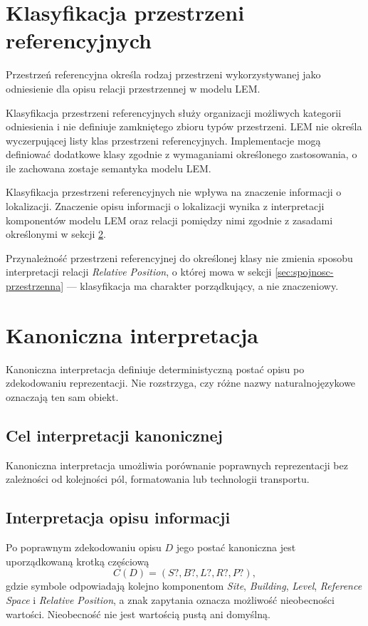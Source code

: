 \section{Klasyfikacja przestrzeni referencyjnych}
\label{sec:klasyfikacja-przestrzeni}
Przestrzeń referencyjna określa rodzaj przestrzeni wykorzystywanej jako odniesienie dla opisu relacji przestrzennej w modelu LEM.

Klasyfikacja przestrzeni referencyjnych służy organizacji możliwych kategorii odniesienia i nie definiuje zamkniętego zbioru typów przestrzeni. LEM nie określa wyczerpującej listy klas przestrzeni referencyjnych. Implementacje mogą definiować dodatkowe klasy zgodnie z wymaganiami określonego zastosowania, o ile zachowana zostaje semantyka modelu LEM.

Klasyfikacja przestrzeni referencyjnych nie wpływa na znaczenie informacji o lokalizacji. Znaczenie opisu informacji o lokalizacji wynika z interpretacji komponentów modelu LEM oraz relacji pomiędzy nimi zgodnie z zasadami określonymi w sekcji \ref{sec:kanoniczna-interpretacja}.

Przynależność przestrzeni referencyjnej do określonej klasy nie zmienia sposobu interpretacji relacji \textit{Relative Position}, o której mowa w sekcji \ref{sec:spojnosc-przestrzenna} --- klasyfikacja ma charakter porządkujący, a nie znaczeniowy.

\section{Kanoniczna interpretacja}
\label{sec:kanoniczna-interpretacja}
Kanoniczna interpretacja definiuje deterministyczną postać opisu po zdekodowaniu reprezentacji. Nie rozstrzyga, czy różne nazwy naturalnojęzykowe oznaczają ten sam obiekt.

\subsection{Cel interpretacji kanonicznej}
\label{sec:cel-interpretacji}
Kanoniczna interpretacja umożliwia porównanie poprawnych reprezentacji bez zależności od kolejności pól, formatowania lub technologii transportu.

\subsection{Interpretacja opisu informacji}
\label{sec:interpretacja-opisu}
Po poprawnym zdekodowaniu opisu $D$ jego postać kanoniczna jest uporządkowaną krotką częściową
\[
C(D)=(S?,B?,L?,R?,P?),
\]
gdzie symbole odpowiadają kolejno komponentom \textit{Site}, \textit{Building}, \textit{Level}, \textit{Reference Space} i \textit{Relative Position}, a znak zapytania oznacza możliwość nieobecności wartości. Nieobecność nie jest wartością pustą ani domyślną.

